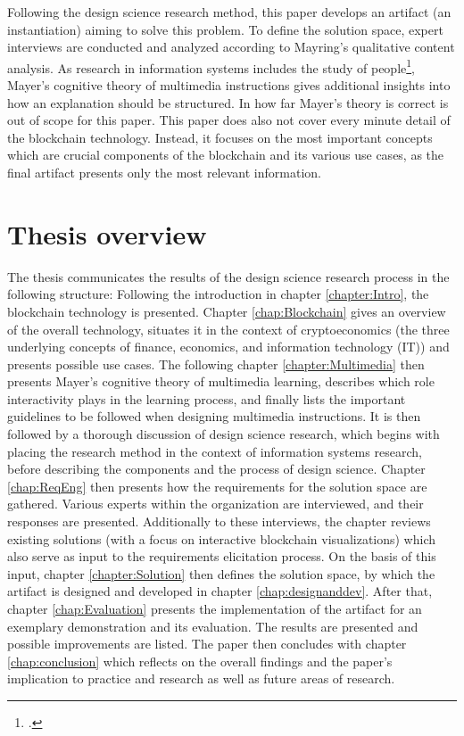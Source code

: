 Following the design science research method, this paper develops an artifact (an instantiation) aiming to solve this problem. To define the solution space, expert interviews are conducted and analyzed according to Mayring's qualitative content analysis. As research in information systems includes the study of people\footcite[Cf.][p.11]{OsterleGestaltungsorientierteWirtschaftsinformatikPladoyer2010}, Mayer's cognitive theory of multimedia instructions gives additional insights into how an explanation should be structured. In how far Mayer's theory is correct is out of scope for this paper. This paper does also not cover every minute detail of the blockchain technology. Instead, it focuses on the most important concepts which are crucial components of the blockchain and its various use cases, as the final artifact presents only the most relevant information. 
    
\section{Thesis overview} \label{sec:ThesisOverview}
The thesis communicates the results of the design science research process in the following structure: Following the introduction in chapter \ref{chapter:Intro}, the blockchain technology is presented. Chapter \ref{chap:Blockchain} gives an overview of the overall technology, situates it in the context of cryptoeconomics (the three underlying concepts of finance, economics, and information technology (IT)) and presents possible use cases. The following chapter \ref{chapter:Multimedia} then presents Mayer's cognitive theory of multimedia learning, describes which role interactivity plays in the learning process, and finally lists the important guidelines to be followed when designing multimedia instructions. It is then followed by a thorough discussion of design science research, which begins with placing the research method in the context of information systems research, before describing the components and the process of design science. Chapter \ref{chap:ReqEng} then presents how the requirements for the solution space are gathered. Various experts within the organization are interviewed, and their responses are presented. Additionally to these interviews, the chapter reviews existing solutions (with a focus on interactive blockchain visualizations) which also serve as input to the requirements elicitation process. On the basis of this input, chapter \ref{chapter:Solution} then defines the solution space, by which the artifact is designed and developed in chapter \ref{chap:designanddev}. After that, chapter \ref{chap:Evaluation} presents the implementation of the artifact for an exemplary demonstration and its evaluation. The results are presented and possible improvements are listed. The paper then concludes with chapter \ref{chap:conclusion} which reflects on the overall findings and the paper's implication to practice and research as well as future areas of research.

